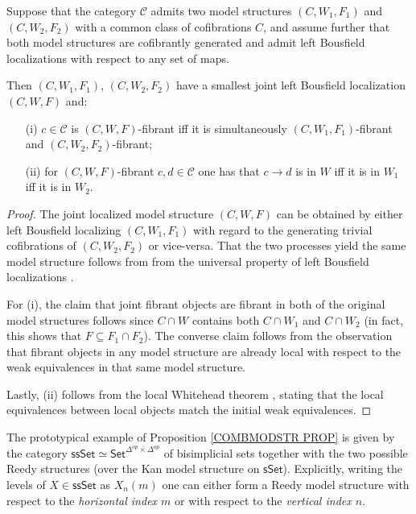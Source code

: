 \documentclass[a4paper,10pt
,draft
]{article}%
\begin{document}
\begin{proposition}\label{COMBMODSTR PROP}
	Suppose that the category $\mathcal{C}$
	admits two model structures $(C,W_1,F_1)$ and $(C,W_2,F_2)$
	with a common class of cofibrations $C$,
	and assume further that both model structures are cofibrantly generated and admit left Bousfield localizations with respect to any set of maps.
	
	Then $(C,W_1,F_1)$, $(C,W_2,F_2)$ have a smallest joint left Bousfield localization 
	$(C,W,F)$ and:
\begin{itemize}
	\item[(i)] $c \in \mathcal{C}$ is $(C,W,F)$-fibrant iff it is simultaneously 
	$(C,W_1,F_1)$-fibrant and $(C,W_2,F_2)$-fibrant;
	\item[(ii)] for $(C,W,F)$-fibrant  
	$c,d \in \mathcal{C}$ one has that $c\to d$ is in $W$ iff it is in $W_1$ iff it is in $W_2$.
\end{itemize}
\end{proposition}

\begin{proof}
The joint localized model structure $(C,W,F)$ can be obtained by either left Bousfield localizing $(C,W_1,F_1)$ with regard to the generating trivial cofibrations of $(C,W_2,F_2)$ or vice-versa. That the two processes yield the same model structure follows from from the universal property of left Bousfield localizations \cite[Prop. 3.4.18]{Hir03}.
	
For (i), the claim that joint fibrant objects are fibrant in both of the original model structures follows since $C \cap W$ contains both $C \cap W_1$ and $C \cap W_2$ (in fact, this shows that $F \subseteq F_1 \cap F_2$).
The converse claim follows from the observation that fibrant objects in any model structure are already local with respect to the weak equivalences in that same model structure.

Lastly, (ii) follows from the local Whitehead theorem \cite[Thm. 3.3.8]{Hir03}, stating that
the local equivalences between local objects match the
initial weak equivalences.
\end{proof}


The prototypical example of Proposition \ref{COMBMODSTR PROP} is given by the category 
$\mathsf{ssSet} \simeq \mathsf{Set}^{\Delta^{op} \times \Delta^{op}}$
of bisimplicial sets together with the two possible Reedy structures (over the Kan model structure on $\mathsf{sSet}$).
Explicitly, writing the levels of 
$X \in \mathsf{ssSet}$ as $X_n(m)$
one can either form a Reedy model structure with respect to the 
\textit{horizontal index $m$}
or with respect to the 
\textit{vertical index $n$}.
\end{document}
